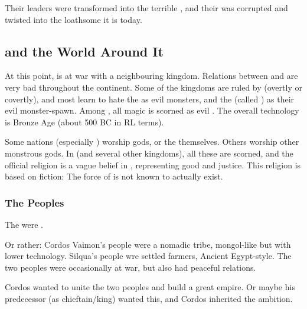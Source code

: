 Their leaders were transformed into the terrible \Sephiroth{}, and their \iquin{} was corrupted and twisted into the loathsome \carcer{} it is today.










\subsection{\Imrath{} and the World Around It}
At this point, \Imrath{} is at war with a neighbouring \scathaese{} kingdom. Relations between \humans{} and \scathae{} are very bad throughout the continent. Some of the \scathaese{} kingdoms are ruled by \dragons{} (overtly or covertly), and most \humans{} learn to hate the \dragons{} as evil monsters, and the \scathae{} (called ) as their evil monster-spawn. Among \humans{}, all magic is scorned as evil \squo{{\dragoncraft}}. The overall technology is Bronze Age (about 500 BC in RL terms). 

Some nations (especially \scathaese{}) worship \draconic{} gods, or the \dragons{} themselves. Others worship other monstrous gods. In \Imrath{} (and several other \human{} kingdoms), all these  are scorned, and the official religion is a vague belief in , representing good and justice. This religion is based on fiction: The force of  is not known to actually exist. 





\subsubsection{The Peoples}
The \Imrathi{} were . 

Or rather: 
Cordos Vaimon's people were a nomadic tribe, mongol-like but with lower technology. 
Silqua's people wre settled farmers, Ancient Egypt-style. 
The two peoples were occasionally at war, but also had peaceful relations. 

Cordos wanted to unite the two peoples and build a great empire. 
Or maybe his predecessor (as chieftain/king) wanted this, and Cordos inherited the ambition. 

